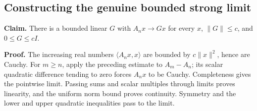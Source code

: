 \documentclass[11pt,a4paper]{report}
\begin{document}
\subsection{\texorpdfstring{Constructing the genuine bounded strong limit}{Constructing the genuine bounded strong limit}}
\label{report-step-WassersteinMixing-MonotoneOperators-lean-2}


\textbf{Claim.} There is a bounded linear \(G\) with \(A_nx\to Gx\) for every \(x\), \(\|G\|\le c\), and \(0\le G\le cI\).



\textbf{Proof.} The increasing real numbers \(\langle A_nx,x\rangle\) are bounded by \(c\|x\|^2\), hence are Cauchy. For \(m\ge n\), apply the preceding estimate to \(A_m-A_n\); its scalar quadratic difference tending to zero forces \(A_nx\) to be Cauchy. Completeness gives the pointwise limit. Passing sums and scalar multiples through limits proves linearity, and the uniform norm bound proves continuity. Symmetry and the lower and upper quadratic inequalities pass to the limit.
\end{document}

